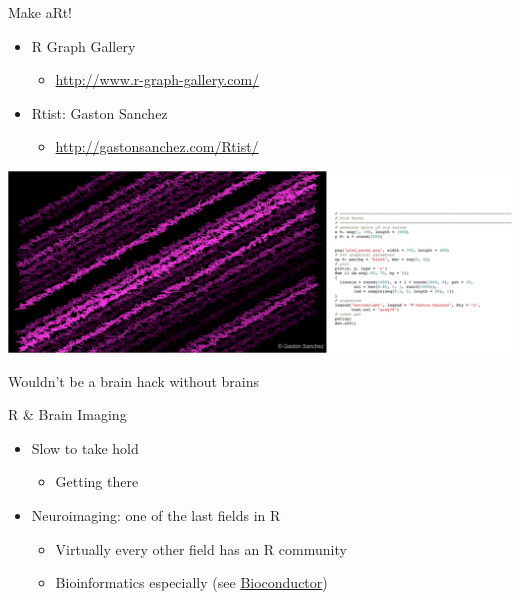 \documentclass[
  ignorenonframetext,
]{beamer}
\providecommand{\tightlist}{%
  \setlength{\itemsep}{0pt}\setlength{\parskip}{0pt}}
\begin{document}
\begin{frame}{Make aRt!}
\protect\hypertarget{make-art}{}

\begin{itemize}
\tightlist
\item
  R Graph Gallery

  \begin{itemize}
  \tightlist
  \item
    \url{http://www.r-graph-gallery.com/}
  \end{itemize}
\item
  Rtist: Gaston Sanchez

  \begin{itemize}
  \tightlist
  \item
    \url{http://gastonsanchez.com/Rtist/}
  \end{itemize}
\end{itemize}

\includegraphics{../external/images/funR_5_aRt_pink_combo.png}

\end{frame}

\begin{frame}{Wouldn't be a brain hack without brains}
\protect\hypertarget{wouldnt-be-a-brain-hack-without-brains}{}

\end{frame}

\begin{frame}{R \& Brain Imaging}
\protect\hypertarget{r-brain-imaging}{}

\begin{itemize}
\tightlist
\item
  Slow to take hold

  \begin{itemize}
  \tightlist
  \item
    Getting there
  \end{itemize}
\item
  Neuroimaging: one of the last fields in R

  \begin{itemize}
  \tightlist
  \item
    Virtually every other field has an R community
  \item
    Bioinformatics especially (see
    \href{https://www.bioconductor.org/}{Bioconductor})
  \end{itemize}
\end{itemize}

\end{frame}
\end{document}
